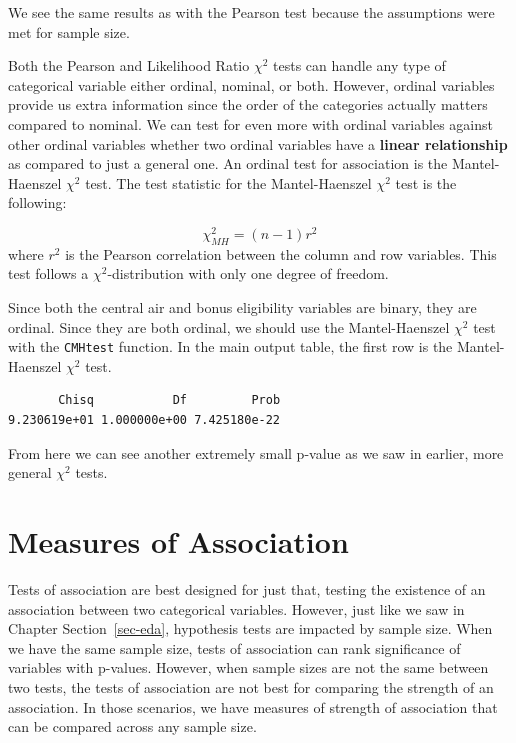 \documentclass[
  letterpaper,
  DIV=11,
  numbers=noendperiod]{scrreprt}
\newenvironment{Shaded}{\begin{snugshade}}{\end{snugshade}}
\newcommand{\DecValTok}[1]{\textcolor[rgb]{0.68,0.00,0.00}{#1}}
\newcommand{\FunctionTok}[1]{\textcolor[rgb]{0.28,0.35,0.67}{#1}}
\newcommand{\NormalTok}[1]{\textcolor[rgb]{0.00,0.23,0.31}{#1}}
\newcommand{\SpecialCharTok}[1]{\textcolor[rgb]{0.37,0.37,0.37}{#1}}
\begin{document}
We see the same results as with the Pearson test because the assumptions
were met for sample size.

Both the Pearson and Likelihood Ratio \(\chi^2\) tests can handle any
type of categorical variable either ordinal, nominal, or both. However,
ordinal variables provide us extra information since the order of the
categories actually matters compared to nominal. We can test for even
more with ordinal variables against other ordinal variables whether two
ordinal variables have a \textbf{linear relationship} as compared to
just a general one. An ordinal test for association is the
Mantel-Haenszel \(\chi^2\) test. The test statistic for the
Mantel-Haenszel \(\chi^2\) test is the following:

\[
\chi^2_{MH} = (n-1)r^2
\] where \(r^2\) is the Pearson correlation between the column and row
variables. This test follows a \(\chi^2\)-distribution with only one
degree of freedom.

Since both the central air and bonus eligibility variables are binary,
they are ordinal. Since they are both ordinal, we should use the
Mantel-Haenszel \(\chi^2\) test with the \texttt{CMHtest} function. In
the main output table, the first row is the Mantel-Haenszel \(\chi^2\)
test.

\begin{Shaded}
\end{Shaded}

\begin{verbatim}
       Chisq           Df         Prob 
9.230619e+01 1.000000e+00 7.425180e-22 
\end{verbatim}

From here we can see another extremely small p-value as we saw in
earlier, more general \(\chi^2\) tests.

\hypertarget{measures-of-association}{%
\section{Measures of Association}\label{measures-of-association}}

Tests of association are best designed for just that, testing the
existence of an association between two categorical variables. However,
just like we saw in Chapter Section~\ref{sec-eda}, hypothesis tests are
impacted by sample size. When we have the same sample size, tests of
association can rank significance of variables with p-values. However,
when sample sizes are not the same between two tests, the tests of
association are not best for comparing the strength of an association.
In those scenarios, we have measures of strength of association that can
be compared across any sample size.
\end{document}
